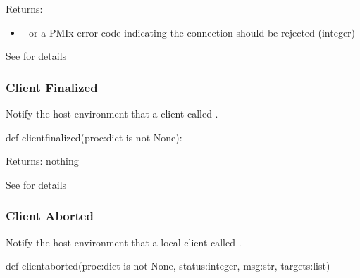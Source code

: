 Returns:
\begin{itemize}
    \item {} -  or a \ac{PMIx} error code indicating the connection should be rejected (integer)
\end{itemize}

See  for details

\subsubsection{Client Finalized}

\summary

Notify the host environment that a client called .

\format

\pyspecificstart
\begin{codepar}
def clientfinalized(proc:dict is not None):
\end{codepar}
\pyspecificend

\begin{arglist}
\end{arglist}

Returns: nothing

See  for details


\subsubsection{Client Aborted}

\summary

Notify the host environment that a local client called .

\format

\pyspecificstart
\begin{codepar}
def clientaborted(proc:dict is not None, status:integer,
                  msg:str, targets:list)
\end{codepar}
\pyspecificend

\begin{arglist}
\end{arglist}

